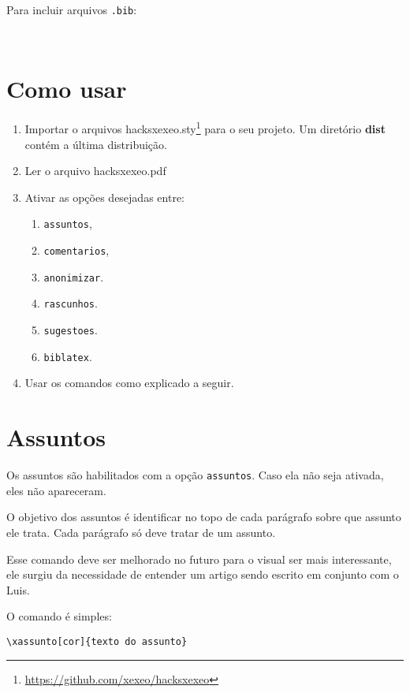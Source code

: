 \documentclass{article}
\begin{document}
Para incluir arquivos \verb|.bib|:
\begin{verbatim}
  
\end{verbatim}


\section{Como usar}

\begin{enumerate}
    \item Importar o arquivos hacksxexeo.sty\footnote{\url{https://github.com/xexeo/hacksxexeo}} para o seu  projeto. Um diretório \textbf{dist} contém a última distribuição.
    \item Ler o arquivo hacksxexeo.pdf
    \item Ativar as opções desejadas entre:
    \begin{enumerate}
        \item \verb!assuntos!,
        \item \verb!comentarios!,
        \item \verb!anonimizar!.
        \item \verb!rascunhos!.
        \item \verb!sugestoes!.
        \item \verb!biblatex!.
    \end{enumerate}
    \item Usar os comandos como explicado a seguir.
\end{enumerate}


\section{Assuntos}

Os assuntos são habilitados com a opção \verb!assuntos!. Caso ela não seja ativada, eles não apareceram.

O objetivo dos assuntos é identificar no topo de cada parágrafo sobre que assunto ele trata. Cada parágrafo só deve tratar de um assunto.

Esse comando deve ser melhorado no futuro para o visual ser mais interessante, ele surgiu da necessidade de entender um artigo sendo escrito em conjunto com o Luis.

O comando é simples:

\begin{verbatim}
\xassunto[cor]{texto do assunto}
\end{verbatim}
\end{document}
